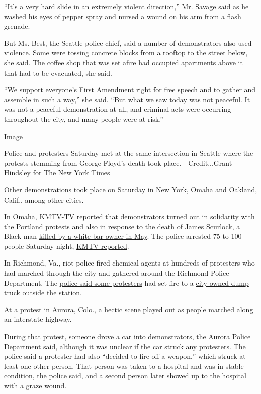 ``It's a very hard slide in an extremely violent direction,'' Mr. Savage
said as he washed his eyes of pepper spray and nursed a wound on his arm
from a flash grenade.

But Ms. Best, the Seattle police chief, said a number of demonstrators
also used violence. Some were tossing concrete blocks from a rooftop to
the street below, she said. The coffee shop that was set afire had
occupied apartments above it that had to be evacuated, she said.

``We support everyone's First Amendment right for free speech and to
gather and assemble in such a way,'' she said. ``But what we saw today
was not peaceful. It was not a peaceful demonstration at all, and
criminal acts were occurring throughout the city, and many people were
at risk.''

Image

Police and protesters Saturday met at the same intersection in Seattle
where the protests stemming from George Floyd's death took
place.~~Credit...Grant Hindsley for The New York Times

Other demonstrations took place on Saturday in New York, Omaha and
Oakland, Calif., among other cities.

In Omaha,
\href{https://www.3newsnow.com/news/local-news/midtown-protest-for-james-scurlock-portland-unrest-leads-to-arrests}{KMTV-TV
reported} that demonstrators turned out in solidarity with the Portland
protests and also in response to the death of James Scurlock, a Black
man
\href{https://omaha.com/news/local/veteran-federal-prosecutor-to-lead-grand-jury-probe-into-james-scurlocks-death/article_f2f0f66d-8400-5923-b441-d2f490c512c7.html}{killed
by a white bar owner in May}. The police arrested 75 to 100 people
Saturday night,
\href{https://www.3newsnow.com/news/local-news/midtown-protest-for-james-scurlock-portland-unrest-leads-to-arrests}{KMTV
reported}.

In Richmond, Va., riot police fired chemical agents at hundreds of
protesters who had marched through the city and gathered around the
Richmond Police Department. The
\href{https://twitter.com/RichmondPolice/status/1287226950822617088}{police
said some protesters} had set fire to a
\href{https://twitter.com/Rob_Desir/status/1287226202592346112?s=20}{city-owned
dump truck} outside the station.

At a protest in Aurora, Colo., a hectic scene played out as people
marched along an interstate highway.

During that protest, someone drove a car into demonstrators, the Aurora
Police Department said, although it was unclear if the car struck any
protesters. The police said a protester had also ``decided to fire off a
weapon,'' which struck at least one other person. That person was taken
to a hospital and was in stable condition, the police said, and a second
person later showed up to the hospital with a graze wound.

